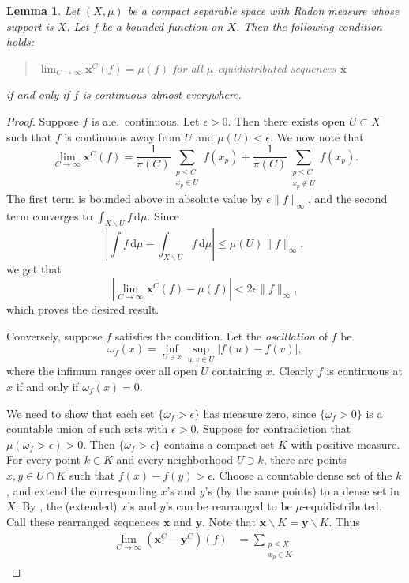 \documentclass{article}
\newcommand{\bx}{\boldsymbol{x}}
\newcommand{\by}{\boldsymbol{y}}
\newcommand{\dd}{\mathrm{d}}
\newtheorem{lemma}[theorem]{Lemma}
\theoremstyle{definition}
\numberwithin{theorem}{section}
\begin{document}
\begin{lemma}
Let $(X,\mu)$ be a compact separable space with Radon measure whose support is 
$X$. Let $f$ be a bounded function on $X$. Then the following condition holds:
\begin{quote}
$\lim_{C\to \infty} \bx^C(f) = \mu(f)$ for all $\mu$-equidistributed sequences $\bx$
\end{quote}
if and only if $f$ is continuous almost everywhere.
\end{lemma}
\begin{proof}
Suppose $f$ is a.e.~continuous. Let $\epsilon>0$. Then there exists open 
$U\subset X$ such that $f$ is continuous away from $U$ and $\mu(U)<\epsilon$. 
We now note that 
\[
	\lim_{C\to \infty} \bx^C(f)
		= \frac{1}{\pi(C)} \sum_{\substack{p\leqslant C \\ x_p\in U}} f(x_p) + \frac{1}{\pi(C)} \sum_{\substack{p\leqslant C \\ x_p\notin U}} f(x_p) .
\]
The first term is bounded above in absolute value by $\epsilon  \|f\|_\infty$, 
and the second term converges to $\int_{X\smallsetminus U} f\, \dd\mu$. Since 
\[
	\left|\int f\, \dd\mu - \int_{X\smallsetminus U} f\, \dd\mu\right| \leqslant \mu(U)\|f\|_\infty ,
\]
we get that 
\[
	\left|\lim_{C\to \infty} \bx^C(f) - \mu(f)\right| < 2\epsilon \|f\|_\infty ,
\]
which proves the desired result.

Conversely, suppose $f$ satisfies the condition. Let the \emph{oscillation} of 
$f$ be 
\[
	\omega_f(x) = \inf_{U\ni x} \sup_{u,v\in U} |f(u)-f(v)| ,
\] 
where the infimum ranges over all open $U$ containing $x$. Clearly $f$ is 
continuous at $x$ if and only if $\omega_f(x)=0$. 

We need to show that each set $\{\omega_f > \epsilon\}$ has measure zero, since 
$\{\omega_f>0\}$ is a countable union of such sets with $\epsilon>0$. Suppose 
for contradiction that $\mu(\omega_f>\epsilon)>0$. Then $\{\omega_f>\epsilon\}$ 
contains a compact set $K$ with positive measure. For every point $k\in K$ and 
every neighborhood $U\ni k$, there are points $x,y\in U\cap K$ such that 
$f(x)-f(y) > \epsilon$. Choose a countable dense set of the $k$, and extend 
the corresponding $x$'s and $y$'s (by the same points) to a dense set in $X$. 
By \cite[Th.~2.4, Ch.~3]{kuipers-niederreiter-1974}, the (extended) $x$'s and 
$y$'s can be rearranged to be $\mu$-equidistributed. Call these rearranged 
sequences $\bx$ and $\by$. Note that 
$\bx \smallsetminus K = \by \smallsetminus K$. Thus 
\begin{align*}
	\lim_{C\to \infty} (\bx^C-\by^C)(f) 
		&= \sum_{\substack{p\leqslant X \\ x_p\in K}}
\end{align*}
\end{proof}
\end{document}
